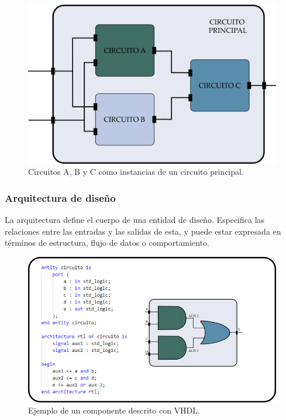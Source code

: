 \begin{figure}
\centering
\includegraphics[scale=.5]{./Figures/vhdl_ejemplo2.png}
\caption{Circuitos A, B y C como instancias de un circuito principal.}
\label{interconexión de componentes}
\end{figure}


\subsubsection{Arquitectura de diseño}

La arquitectura define el cuerpo de una entidad de diseño. Especifica las relaciones entre las entradas y las salidas de esta, y puede estar expresada en términos de estructura, flujo de datos o comportamiento.


\begin{figure}
\centering
\includegraphics[scale=.65]{./Figures/vhdl_ejemplo.png}
\caption{Ejemplo de un componente descrito con VHDL.}
\label{componente vhdl}
\end{figure}

